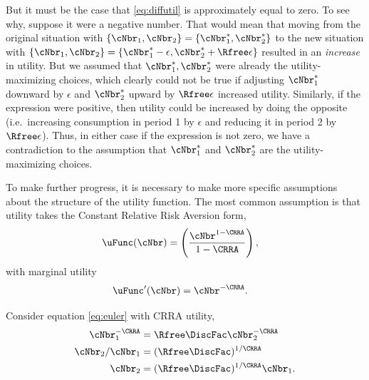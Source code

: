   But it must be the case that \eqref{eq:diffutil} is approximately equal to zero.  To
  see why, suppose it were a negative number.  That would mean that
  moving from the original situation with $\{\cNbr_{1},\cNbr_{2}\} =
  \{\cNbr_{1}^{*},\cNbr_{2}^{*}\}$ to the new situation with $\{\cNbr_{1},\cNbr_{2}\}
  = \{\cNbr_{1}^{*}-\epsilon,\cNbr_{2}^{*}+\Rfree\epsilon\}$ resulted in an {\it
    increase} in utility.  But we assumed that $\cNbr_{1}^{*},\cNbr_{2}^{*}$ were
  already the utility-maximizing choices, which clearly could not be
  true if adjusting $\cNbr_{1}^{*}$ downward by $\epsilon$ and $\cNbr^{*}_{2}$
  upward by $\Rfree \epsilon$ increased utility.  Similarly, if the
  expression were positive, then utility could be increased by doing the
  opposite (i.e.\ increasing consumption in period 1 by $\epsilon$ and
  reducing it in period 2 by $\Rfree\epsilon$).  Thus, in either case if the
  expression is not zero, we have a contradiction to the assumption that
  $\cNbr_{1}^{*}$ and $\cNbr_{2}^{*}$ are the utility-maximizing choices.

  To make further progress, it is necessary to make
  more specific assumptions about the structure of the utility function.
  The most common assumption is that utility takes the Constant Relative
  Risk Aversion form,
  \begin{equation}\begin{gathered}\begin{aligned}
        \uFunc(\cNbr) & =  \left(\frac{\cNbr^{1-\CRRA}}{1-\CRRA}\right) \label{eq:crrautil},
      \end{aligned}\end{gathered}\end{equation}
  with marginal utility
  \begin{equation}\begin{gathered}\begin{aligned}
        \uFunc^{\prime}(\cNbr) & =  \cNbr^{-\CRRA} \label{eq:crramargutil}.
      \end{aligned}\end{gathered}\end{equation}

  Consider equation \eqref{eq:euler} with CRRA utility,
  \begin{equation}\begin{gathered}\begin{aligned}
        \cNbr_{1}^{-\CRRA} & =  \Rfree\DiscFac \cNbr_{2}^{-\CRRA}  \\
        \cNbr_{2}/\cNbr_{1} & =  (\Rfree\DiscFac)^{1/\CRRA}   \\
        \cNbr_{2} & =  (\Rfree\DiscFac)^{1/\CRRA}\cNbr_{1} \label{eq:c1euler}.
      \end{aligned}\end{gathered}\end{equation}

